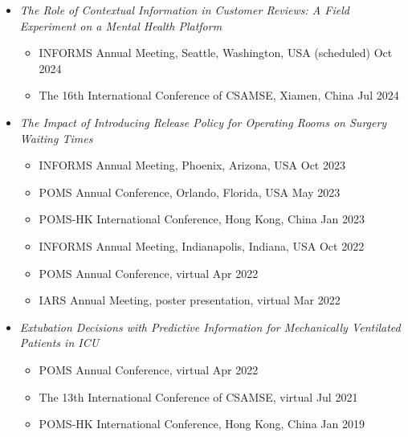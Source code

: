 \documentclass[12pt, a4paper]{article}
\begin{document}
{\begin{itemize}[leftmargin=26pt, itemsep=8pt, parsep=0.2pt, topsep=1pt]
	\item {\it The Role of Contextual Information in Customer Reviews: A Field Experiment on a Mental Health Platform}
	\begin{itemize}
		\item INFORMS Annual Meeting, Seattle, Washington, USA (scheduled) \hfill Oct 2024
		\item The 16th International Conference of CSAMSE, Xiamen, China \hfill Jul 2024
	\end{itemize}

	\item {\it The Impact of Introducing Release Policy for Operating Rooms on Surgery Waiting Times}
	\begin{itemize}[leftmargin=14pt, itemsep=2pt, topsep=2pt]
		\item INFORMS Annual Meeting, Phoenix, Arizona, USA \hfill Oct 2023
		\item POMS Annual Conference, Orlando, Florida, USA \hfill May 2023
		\item POMS-HK International Conference, Hong Kong, China \hfill Jan 2023
		\item INFORMS Annual Meeting, Indianapolis, Indiana, USA \hfill Oct 2022
		\item POMS Annual Conference, virtual \hfill Apr 2022
		\item IARS Annual Meeting, poster presentation, virtual \hfill Mar 2022
	\end{itemize}

	\item {\it Extubation Decisions with Predictive Information for Mechanically Ventilated Patients in ICU}
	\begin{itemize}[leftmargin=14pt, itemsep=4pt, topsep=2pt]
		\item POMS Annual Conference, virtual \hfill Apr 2022
		\item The 13th International Conference of CSAMSE, virtual \hfill Jul 2021
		\item POMS-HK International Conference, Hong Kong, China \hfill Jan 2019
	\end{itemize}

\end{itemize}




}
\end{document}
